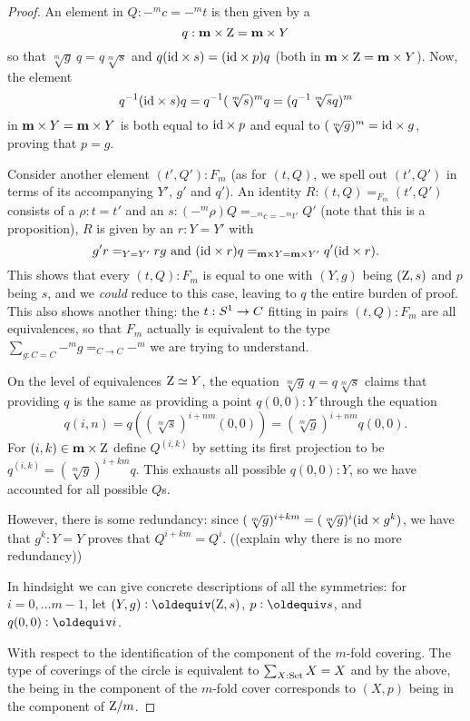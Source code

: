 \begin{proof}
An element in $Q:-^mc=-^mt$ is then given by a 
$$q:\mathbf{m}\times\mathrm{Z}=\mathbf{m}\times Y$$ so that $\sqrt[m]g\ q=q\sqrt[m]s$ and $q(\mathord{\mathrm{id}}\times s)=(\mathord{\mathrm{id}}\times p)q$ (both in $\mathbf{m}\times\mathrm{Z}=\mathbf{m}\times Y$). 
Now, the element $$q^{-1}(\mathord{\mathrm{id}}\times s)q=q^{-1}(\sqrt[m]s)^mq=(q^{-1}\sqrt[m]sq)^m$$ in $\mathbf{m}\times Y=\mathbf{m}\times Y$ is both equal to $\mathord{\mathrm{id}}\times p$ and equal to $(\sqrt[m]g)^m=\mathord{\mathrm{id}}\times g$, proving that $p=g$. 


Consider another element $(t',Q'):F_m$ (as for $(t,Q)$, we spell out $(t',Q')$ in terms of its accompanying $Y'$, $g'$ and $q'$). 
An identity  $R:(t,Q)=_{F_m}(t',Q')$ consists of a $\rho:t=t'$ and an $s:(-^m\rho)Q=_{-^mc=-^mt'}Q'$ (note that this is a proposition), \ie $R$ is given by an $r:Y=Y'$ with 
$$g'r=_{Y=Y'}rg\text{ and }(\mathord{\mathrm{id}}\times r)q=_{\mathbf{m}\times Y=\mathbf{m}\times Y'}q'(\mathord{\mathrm{id}}\times r).$$  This shows that every $(t,Q):F_m$ is equal to one with $(Y,g)$ being $(\mathrm{Z},s)$ and $p$ being $s$, and we \emph{could} reduce to this case, leaving to $q$ the entire burden of proof.  
This also shows another thing: the $t:{S^1}\to C$ fitting in pairs $(t,Q):F_m$ are all equivalences, so that $F_m$ actually is equivalent to the type $\sum_{g:C=C}-^mg=_{C\to C}-^m$ we are trying to understand.

 On the level of equivalences $\mathrm{Z}\simeq Y$, the equation  $\sqrt[m]g\ q=q\sqrt[m]s$ claims that providing $q$ is the same as providing a point $q(0,0):Y$ through the equation  
$$q(i,n)=q((\sqrt[m]s)^{i+nm}(0,0))=(\sqrt[m]g)^{i+nm}q(0,0).$$  For $(i,k)\in \mathbf{m}\times\mathrm{Z}$ define $Q^{(i,k)}$ by setting its first projection to be $q^{(i,k)}=(\sqrt[m]g)^{i+km}q$.  
This exhausts all possible $q(0,0):Y$, so we have accounted for all possible $Q$s.

However, there is some redundancy: since $(\sqrt[m]g)^{i+km}=(\sqrt[m]g)^i(\mathord{\mathrm{id}}\times g^k)$, we have that $g^k:Y=Y$ proves that $Q^{i+km}=Q^{i}$.  ((explain why there is no more redundancy)) 

In hindsight we can give concrete descriptions of all the symmetries: for $i=0,\dots m-1$, let $(Y,g)\defequi (\zet,s)$, $p\defequi s$, and $q(0,0)\defequi i$.

With respect to the identification of the component of the $m$-fold covering.  The type of coverings of the circle is equivalent to $\sum_{X:\mathord{\mathrm{Set}}}X=X$ and by the above, the \covering being in the component of the $m$-fold cover corresponds to $(X,p)$ being in the component of $\mathrm{Z}/m$.
  \end{proof}

